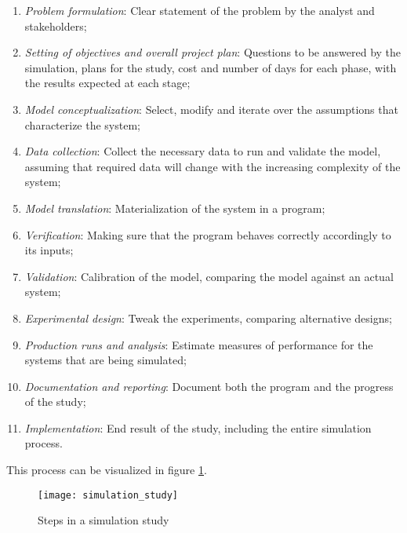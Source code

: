 \begin{enumerate}
    \item \textit{Problem formulation}: Clear statement of the problem by the 
    analyst and stakeholders; \label{enum:mform}
    \item \textit{Setting of objectives and overall project plan}: Questions to 
    be answered by the simulation, plans for the study, cost and number of days 
    for each phase, with the results expected at each stage; \label{enum:mobj}
    \item \textit{Model conceptualization}: Select, modify and iterate over the 
    assumptions that characterize the system; \label{enum:mconcept}
    \item \textit{Data collection}: Collect the necessary data to run and 
    validate the model, assuming that required data will change with the 
    increasing complexity of the system; \label{enum:mdata}
    \item \textit{Model translation}: Materialization of the system in a 
    program; \label{enum:mtransl}
    \item \textit{Verification}: Making sure that the program behaves correctly 
    accordingly to its inputs; \label{enum:mverif}
    \item \textit{Validation}: Calibration of the model, comparing the model 
    against an actual system; \label{enum:mvalid}
    \item \textit{Experimental design}: Tweak the experiments, comparing 
    alternative designs; \label{enum:mexp}
    \item \textit{Production runs and analysis}: Estimate measures of 
    performance for the systems that are being simulated; \label{enum:mprod}
    \item \textit{Documentation and reporting}: Document both the program and 
    the progress of the study; \label{enum:mdocs}
    \item \textit{Implementation}: End result of the study, including the 
    entire simulation process. \label{enum:mimpl}
\end{enumerate}

This process can be visualized in figure \ref{fig:sim}.

\begin{figure}[p]
    \begin{center}
        \leavevmode
        \texttt{[image: simulation\_study]}
        \caption{Steps in a simulation study \cite{Banks2004}}
        \label{fig:sim}
    \end{center}
\end{figure}

